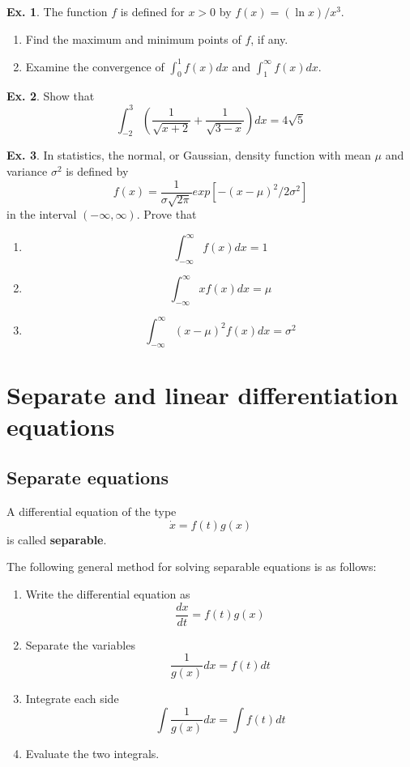 \documentclass[10pt,a4paper]{book}
\theoremstyle{definition}\newtheorem{definition}{Definition}
\theoremstyle{definition}\newtheorem{fact}{Fact}
\theoremstyle{definition}\newtheorem{ex}{Ex.}
\theoremstyle{definition}\newtheorem{project}{Project}
\theoremstyle{definition}\newtheorem{problem}{Problem}
\theoremstyle{definition}\newtheorem{example}{Example}
\numberwithin{theorem}{chapter}
\numberwithin{corollary}{chapter}
\numberwithin{assumption}{chapter}
\numberwithin{definition}{chapter}
\numberwithin{prop}{chapter}
\numberwithin{notation}{chapter}
\numberwithin{problem}{chapter}
\numberwithin{example}{chapter}
\numberwithin{fact}{chapter}
\numberwithin{ex}{chapter}
\begin{document}
	\begin{ex}
		The function $f$ is defined for $x > 0$ by $f(x) = (\ln x)/x^3$.
		\begin{enumerate}[label=(\alph*)]
			\item Find the maximum and minimum points of $f$, if any.
			\item Examine the convergence of $\int_0^1 f(x) dx$ and $\int_1^{\infty} f(x) dx$.
		\end{enumerate}
	\end{ex}
	
	\begin{ex}
		Show that
		$$\int_{-2}^3 \left( \frac{1}{\sqrt{x+2}} + \frac{1}{\sqrt{3-x}} \right) dx = 4\sqrt{5}$$
	\end{ex}
	
	\begin{ex}
		In statistics, the normal, or Gaussian, density function with mean $\mu$ and variance $\sigma^2$ is defined by
		$$f(x) = \frac{1}{\sigma \sqrt{2\pi}} exp[-(x-\mu)^2/2\sigma^2]$$
		in the interval $(-\infty,\infty)$. Prove that
		\begin{enumerate}[label=(\alph*)]
			\item $$\int_{-\infty}^{\infty} f(x)dx = 1$$
			\item $$\int_{-\infty}^{\infty} xf(x)dx = \mu$$
			\item $$\int_{-\infty}^{\infty} (x-\mu)^2f(x)dx = \sigma^2$$
		\end{enumerate}
	\end{ex}
	
	\section{Separate and linear differentiation equations}
	
	\subsection{Separate equations}
	
	A differential equation of the type
	$$\dot{x} = f(t) g(x)$$
	is called \textbf{separable}. 
	
	The following general method for solving separable equations is as follows:
	\begin{enumerate}[label=(\roman*)]
		\item Write the differential equation as
		$$\frac{dx}{dt} = f(t)g(x)$$
		\item Separate the variables
		$$\frac{1}{g(x)}dx = f(t)dt$$
		\item Integrate each side
		$$\int \frac{1}{g(x)}dx = \int f(t)dt$$
		\item Evaluate the two integrals.
	\end{enumerate}
	
\end{document}
